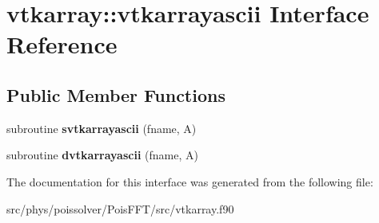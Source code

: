 \hypertarget{interfacevtkarray_1_1vtkarrayascii}{}\section{vtkarray\+:\+:vtkarrayascii Interface Reference}
\label{interfacevtkarray_1_1vtkarrayascii}
\subsection*{Public Member Functions}
\begin{DoxyCompactItemize}
\item 
subroutine {\bfseries svtkarrayascii} (fname, A)\hypertarget{interfacevtkarray_1_1vtkarrayascii_a8ab2c623dfd99580a8efa5caef1907a2}{}\label{interfacevtkarray_1_1vtkarrayascii_a8ab2c623dfd99580a8efa5caef1907a2}

\item 
subroutine {\bfseries dvtkarrayascii} (fname, A)\hypertarget{interfacevtkarray_1_1vtkarrayascii_a3fb8156378119e70cbb8014e39b0542b}{}\label{interfacevtkarray_1_1vtkarrayascii_a3fb8156378119e70cbb8014e39b0542b}

\end{DoxyCompactItemize}


The documentation for this interface was generated from the following file\+:\begin{DoxyCompactItemize}
\item 
src/phys/poissolver/\+Pois\+F\+F\+T/src/vtkarray.\+f90\end{DoxyCompactItemize}
